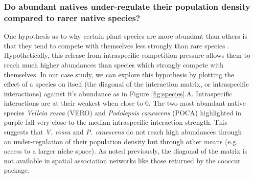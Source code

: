 \documentclass[a4,12pt]{article}
\begin{document}
    \subsubsection*{Do abundant natives under-regulate their population density compared to rarer native species?}
    One hypothesis as to why certain plant species are more abundant than others is that they tend to compete with themselves less strongly than rare species \parencite{Yenni2012, Yenni2017}. Hypothetically, this release from intraspecific competition pressure allows them to reach much higher abundances than species which strongly compete with themselves. In our case study, we can explore this hypothesis by plotting the effect of a species on itself (the diagonal of the interaction matrix, or intraspecific interactions) against it's abundance as in Figure \ref{fig:species}.A. Intraspecific interactions are at their weakest when close to $0$. The two most abundant native species \textit{Velleia rosea} (VERO) and \textit{Podolepsis canescens} (POCA) highlighted in purple fall very close to the median intraspecific interaction strength. This suggests that \textit{V. rosea} and \textit{P. canescens} do not reach high abundances through an under-regulation of their population density but through other means (e.g. access to a larger niche space). As noted previously, the diagonal of the matrix is not available in spatial association networks like those returned by the cooccur package.
\end{document}
